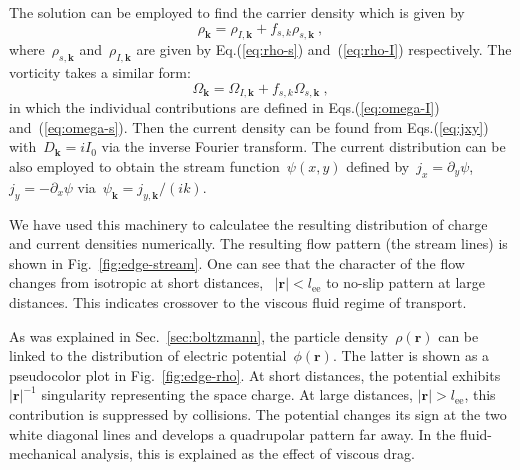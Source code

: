 \documentclass[preprint,aps,eqsecnum]{revtex4-1}
\begin{document}
The solution can be employed to find the carrier density which is given by
\begin{equation}
  \rho_{\bm k} = \rho_{I, {\bm k}} + f_{s, k} \rho_{s, {\bm k}}
  \ ,
\end{equation}
where~$\rho_{s, {\bm k}}$ and~$\rho_{I, {\bm k}}$
are given by Eq.(\ref{eq:rho-s})
and~(\ref{eq:rho-I}) respectively. The vorticity takes a similar form:
\begin{equation}
  \Omega_{\bm k} = \Omega_{I, {\bm k}} + f_{s, k} \Omega_{s, {\bm k}}
\ ,
\end{equation}
in which the individual contributions are defined in Eqs.(\ref{eq:omega-I})
and~(\ref{eq:omega-s}). Then the current density can be found
from Eqs.(\ref{eq:jxy}) with~$D_{\bm k} = i I_0$
via the inverse Fourier transform.
The current distribution can be also employed to obtain the stream
function~$\psi(x, y)$ defined by~$j_x = \partial_y \psi$,
$j_y = - \partial_x \psi$ via~$\psi_{\bm k} = j_{y, {\bm k}}/(ik)$.

We have used this machinery to calculatee the resulting distribution
of charge and current densities numerically.
The resulting flow pattern (the stream lines) is shown in
Fig.~\ref{fig:edge-stream}. One can see that the character of the flow
changes from isotropic at short distances, ~$|{\bm r}| < l_\mathrm{ee}$ to
no-slip pattern at large distances. This indicates crossover to the viscous
fluid regime of transport.

As was explained in Sec.~\ref{sec:boltzmann}, the particle
density~$\rho({\bm r})$ can be linked to the distribution of electric
potential~$\phi({\bm r})$. The latter is shown as a pseudocolor
plot in Fig.~\ref{fig:edge-rho}. At short distances, the potential
exhibits~$|{\bm r}|^{-1}$ singularity representing the space charge.
At large distances, $|{\bm r}| > l_\mathrm{ee}$, this contribution
is suppressed by collisions.
The potential changes its sign at the two white diagonal lines and develops
a quadrupolar pattern far away.
In the fluid-mechanical analysis\cite{bib:Levitov-Falkovich}, this is
explained as the effect of viscous drag.
\end{document}
